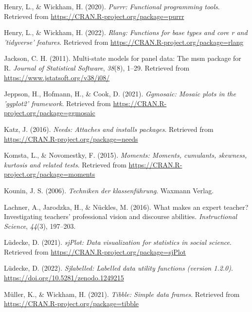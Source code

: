 \documentclass[
  man,floatsintext]{apa6}
\newlength{\cslhangindent}
\newlength{\cslentryspacingunit} %
\newenvironment{CSLReferences}[2] %
 {%
  \setlength{\parindent}{0pt}
  \ifodd #1
  \let\oldpar\par
  \def\par{\hangindent=\cslhangindent\oldpar}
  \fi
  \setlength{\parskip}{#2\cslentryspacingunit}
 }%
 {}
\begin{document}
\begin{CSLReferences}{1}{0}
\leavevmode{}%
Henry, L., \& Wickham, H. (2020). \emph{Purrr: Functional programming tools}. Retrieved from \url{https://CRAN.R-project.org/package=purrr}

\leavevmode{}%
Henry, L., \& Wickham, H. (2022). \emph{Rlang: Functions for base types and core r and 'tidyverse' features}. Retrieved from \url{https://CRAN.R-project.org/package=rlang}

\leavevmode{}%
Jackson, C. H. (2011). Multi-state models for panel data: The {msm} package for {R}. \emph{Journal of Statistical Software}, \emph{38}(8), 1--29. Retrieved from \url{https://www.jstatsoft.org/v38/i08/}

\leavevmode{}%
Jeppson, H., Hofmann, H., \& Cook, D. (2021). \emph{Ggmosaic: Mosaic plots in the 'ggplot2' framework}. Retrieved from \url{https://CRAN.R-project.org/package=ggmosaic}

\leavevmode{}%
Katz, J. (2016). \emph{Needs: Attaches and installs packages}. Retrieved from \url{https://CRAN.R-project.org/package=needs}

\leavevmode{}%
Komsta, L., \& Novomestky, F. (2015). \emph{Moments: Moments, cumulants, skewness, kurtosis and related tests}. Retrieved from \url{https://CRAN.R-project.org/package=moments}

\leavevmode{}%
Kounin, J. S. (2006). \emph{Techniken der klassenf{ü}hrung}. Waxmann Verlag.

\leavevmode{}%
Lachner, A., Jarodzka, H., \& Nückles, M. (2016). What makes an expert teacher? Investigating teachers' professional vision and discourse abilities. \emph{Instructional Science}, \emph{44}(3), 197--203.

\leavevmode{}%
Lüdecke, D. (2021). \emph{sjPlot: Data visualization for statistics in social science}. Retrieved from \url{https://CRAN.R-project.org/package=sjPlot}

\leavevmode{}%
Lüdecke, D. (2022). \emph{Sjlabelled: Labelled data utility functions (version 1.2.0)}. \url{https://doi.org/10.5281/zenodo.1249215}

\leavevmode{}%
Müller, K., \& Wickham, H. (2021). \emph{Tibble: Simple data frames}. Retrieved from \url{https://CRAN.R-project.org/package=tibble}


\end{CSLReferences}
\end{document}
